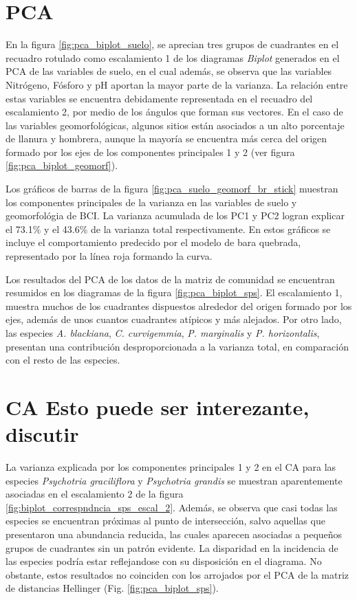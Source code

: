 \documentclass[11pt,]{article}
\begin{document}
\section{PCA}\label{pca}

En la figura \ref{fig:pca_biplot_suelo}, se aprecian tres grupos de
cuadrantes en el recuadro rotulado como escalamiento 1 de los diagramas
\emph{Biplot} generados en el PCA de las variables de suelo, en el cual
además, se observa que las variables Nitrógeno, Fósforo y pH aportan la
mayor parte de la varianza. La relación entre estas variables se
encuentra debidamente representada en el recuadro del escalamiento 2,
por medio de los ángulos que forman sus vectores. En el caso de las
variables geomorfológicas, algunos sitios están asociados a un alto
porcentaje de llanura y hombrera, aunque la mayoría se encuentra más
cerca del origen formado por los ejes de los componentes principales 1 y
2 (ver figura \ref{fig:pca_biplot_geomorf}).

Los gráficos de barras de la figura \ref{fig:pca_suelo_geomorf_br_stick}
muestran los componentes principales de la varianza en las variables de
suelo y geomorfológia de BCI. La varianza acumulada de los PC1 y PC2
logran explicar el 73.1\% y el 43.6\% de la varianza total
respectivamente. En estos gráficos se incluye el comportamiento
predecido por el modelo de bara quebrada, representado por la línea roja
formando la curva.

Los resultados del PCA de los datos de la matriz de comunidad se
encuentran resumidos en los diagramas de la figura
\ref{fig:pca_biplot_sps}. El escalamiento 1, muestra muchos de los
cuadrantes dispuestos alrededor del origen formado por los ejes, además
de unos cuantos cuadrantes atípicos y más alejados. Por otro lado, las
especies \emph{A. blackiana}, \emph{C. curvigemmia}, \emph{P.
marginalis} y \emph{P. horizontalis}, presentan una contribución
desproporcionada a la varianza total, en comparación con el resto de las
especies.

\section{CA Esto puede ser interezante,
discutir}\label{ca-esto-puede-ser-interezante-discutir}

La varianza explicada por los componentes principales 1 y 2 en el CA
para las especies \emph{Psychotria graciliflora} y \emph{Psychotria
grandis} se muestran aparentemente asociadas en el escalamiento 2 de la
figura \ref{fig:biplot_correspndncia_sps_escal_2}. Además, se observa
que casi todas las especies se encuentran próximas al punto de
intersección, salvo aquellas que presentaron una abundancia reducida,
las cuales aparecen asociadas a pequeños grupos de cuadrantes sin un
patrón evidente. La disparidad en la incidencia de las especies podría
estar reflejandose con su disposición en el diagrama. No obstante, estos
resultados no coinciden con los arrojados por el PCA de la matriz de
distancias Hellinger (Fig. \ref{fig:pca_biplot_sps}).
\end{document}
